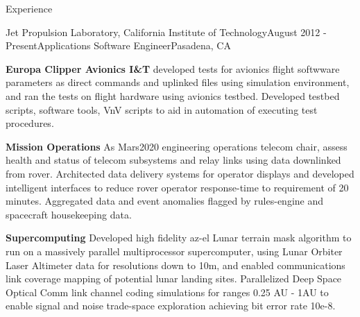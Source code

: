 \documentclass{resume} %
\begin{document}





\begin{rSection}{Experience}
\begin{rSubsection}{Jet Propulsion Laboratory, California Institute of Technology}{August 2012 - Present}{Applications Software Engineer}{Pasadena, CA}


\item \textbf{Europa Clipper Avionics I\&T} developed tests for avionics flight softwware parameters as direct commands and uplinked files using simulation environment, and ran the tests on flight hardware using avionics testbed. Developed testbed scripts, software tools, VnV scripts to aid in automation of executing test procedures.

\item \textbf{Mission Operations} As Mars2020 engineering operations telecom chair, assess health and status of telecom subsystems and relay links using data downlinked from rover. Architected data delivery systems for operator displays and developed intelligent interfaces to reduce rover operator response-time to requirement of 20 minutes. Aggregated data and event anomalies flagged by rules-engine and spacecraft housekeeping data.


\item \textbf{Supercomputing} Developed high fidelity az-el Lunar terrain mask algorithm to run on a massively parallel multiprocessor supercomputer, using Lunar Orbiter Laser Altimeter data for resolutions down to 10m, and enabled communications link coverage mapping of potential lunar landing sites. Parallelized Deep Space Optical Comm link channel coding simulations for ranges 0.25 AU - 1AU to enable signal and noise trade-space exploration achieving bit error rate 10e-8. 
 


\end{rSubsection}
\end{rSection}
\end{document}
